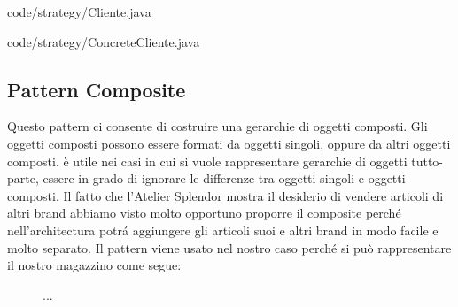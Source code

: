 \documentclass[12pt]{article}
\begin{document}

{code/strategy/Cliente.java}


{code/strategy/ConcreteCliente.java}


\subsection{Pattern Composite}
Questo pattern ci consente di costruire una gerarchie di oggetti composti. Gli oggetti composti possono essere formati da oggetti singoli, oppure da altri oggetti composti. è utile nei casi in cui si vuole rappresentare gerarchie di oggetti tutto-parte, essere in grado di ignorare le differenze tra oggetti singoli e oggetti composti. Il fatto che l'Atelier Splendor mostra il desiderio di vendere articoli di altri brand abbiamo visto molto opportuno proporre il composite perch\'e nell'architectura potr\'a aggiungere gli articoli suoi e altri brand in modo facile e molto separato.
Il pattern viene usato nel nostro caso perché si può rappresentare il nostro magazzino come segue:

\begin{figure}[!t]
    \centering
  \caption{\small ...}
  \label{fig:diagram_composite}
\end{figure}
\end{document}
